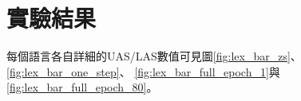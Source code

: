 \section{實驗結果}
% 




%

%

%

每個語言各自詳細的UAS/LAS數值可見圖\ref{fig:lex_bar_zs}、\ref{fig:lex_bar_one_step}、
\ref{fig:lex_bar_full_epoch_1}與\ref{fig:lex_bar_full_epoch_80}。

